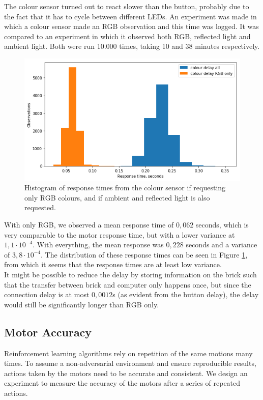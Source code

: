 \documentclass[11pt, a4paper]{article}
\begin{document}
The colour sensor turned out to react slower than the button, probably due to the fact that it has to cycle between different LEDs. An experiment was made in which a colour sensor made an RGB observation and this time was logged. It was compared to an experiment in which it observed both RGB, reflected light and ambient light. Both were run 10.000 times, taking 10 and 38 minutes respectively. \\
\begin{figure}[H]
	\centering
	\includegraphics[scale=0.7]{images/colour_response_histogram.png} 	
	\caption{Histogram of  response times from the colour sensor if requesting only RGB colours, and if ambient and reflected light is also requested.}
	\label{fig:responsetimecolour}
\end{figure}
With only RGB, we observed a mean response time of $0,062$ seconds, which is very comparable to the motor response time, but with a lower variance at $1,1\cdot 10^{-4}$. With everything, the mean response was $0,228$ seconds and a variance of $3,8 \cdot 10^{-4}$. The distribution of these response times can be seen in Figure \ref{fig:responsetimecolour}, from which it seems that the response times are at least low variance. \\
It might be possible to reduce the delay by storing information on the brick such that the transfer between brick and computer only happens once, but since the connection delay is at most $0,0012$s (as evident from the button delay), the delay would still be significantly longer than RGB only.


\subsection{Motor Accuracy}
Reinforcement learning algorithms rely on repetition of the same motions many times. To assume a non-adversarial environment and ensure reproducible results, actions taken by the motors need to be accurate and consistent. We design an experiment to measure the accuracy of the motors after a series of repeated actions.
\end{document}
